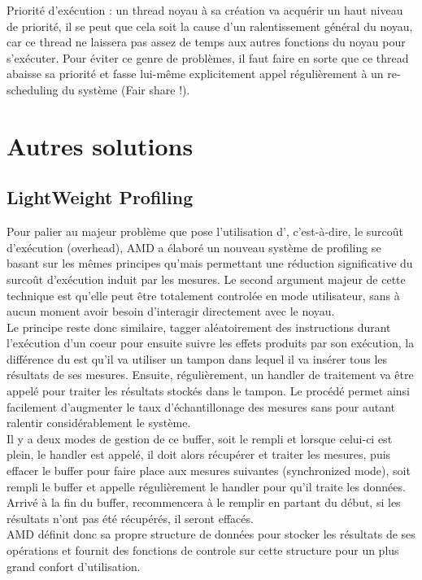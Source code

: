 							\item{Priorité d'exécution : un thread noyau à sa création va acquérir un haut niveau de priorité, il se peut que cela soit la cause d'un ralentissement général du noyau, car ce thread ne laissera pas assez de temps aux autres fonctions du noyau pour s'exécuter. Pour éviter ce genre de problèmes, il faut faire en sorte que ce thread abaisse sa priorité et fasse lui-même explicitement appel régulièrement à un re-scheduling du système (Fair share !).}

						\eitem
			\section{Autres solutions}
				\subsection{LightWeight Profiling}
					Pour palier au majeur problème que pose l'utilisation d'\IBS, c'est-à-dire, le surcoût d'exécution (overhead), AMD a élaboré un nouveau système de profiling se basant sur les mêmes principes qu'\IBS mais permettant une réduction significative du surcoût d'exécution induit par les mesures. Le second argument majeur de cette technique est qu'elle peut être totalement controlée en mode utilisateur, sans à aucun moment avoir besoin d'interagir directement avec le noyau.\\
					Le principe reste donc similaire, tagger aléatoirement des instructions durant l'exécution d'un coeur pour ensuite suivre les effets produits par son exécution, la différence du \lwp est qu'il va utiliser un tampon dans lequel il va insérer tous les résultats de ses mesures. Ensuite, régulièrement, un handler de traitement va être appelé pour traiter les résultats stockés dans le tampon. Le procédé permet ainsi facilement d'augmenter le taux d'échantillonage des mesures sans pour autant ralentir considérablement le système.\\
					Il y a deux modes de gestion de ce buffer, soit \lwp le rempli et lorsque celui-ci est plein, le handler est appelé, il doit alors récupérer et traiter les mesures, puis effacer le buffer pour faire place aux mesures suivantes (synchronized mode), soit \lwp rempli le buffer et appelle régulièrement le handler pour qu'il traite les données. Arrivé à la fin du buffer, \lwp recommencera à le remplir en partant du début, si les résultats n'ont pas été récupérés, il seront effacés.\\
					AMD définit donc sa propre structure de données pour stocker les résultats de ses opérations et fournit des fonctions de controle sur cette structure pour un plus grand confort d'utilisation.
